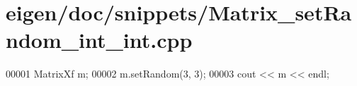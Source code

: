 \hypertarget{eigen_2doc_2snippets_2_matrix__set_random__int__int_8cpp_source}{}\section{eigen/doc/snippets/\+Matrix\+\_\+set\+Random\+\_\+int\+\_\+int.cpp}
\label{eigen_2doc_2snippets_2_matrix__set_random__int__int_8cpp_source}

\begin{DoxyCode}
00001 MatrixXf m;
00002 m.setRandom(3, 3);
00003 cout << m << endl;
\end{DoxyCode}
